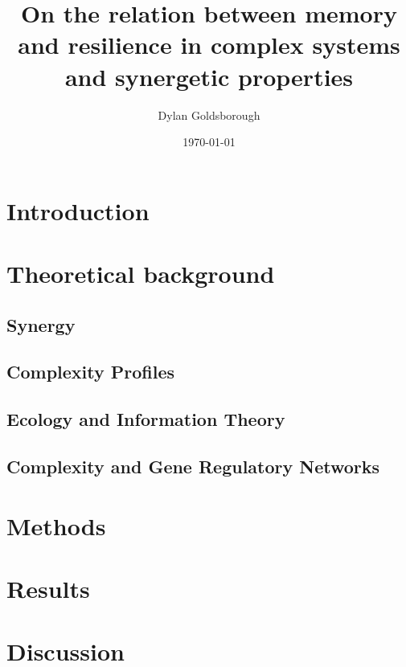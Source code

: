 \documentclass{article}
\title{On the relation between memory and resilience in complex systems and synergetic properties}
\author{Dylan Goldsborough}
\date{\today}
\begin{document}
\maketitle



\section{Introduction}



\section{Theoretical background}

\subsection{Synergy}



\subsection{Complexity Profiles}



\subsection{Ecology and Information Theory}


\subsection{Complexity and Gene Regulatory Networks}



\section{Methods}



\section{Results}



\section{Discussion}




\end{document}
